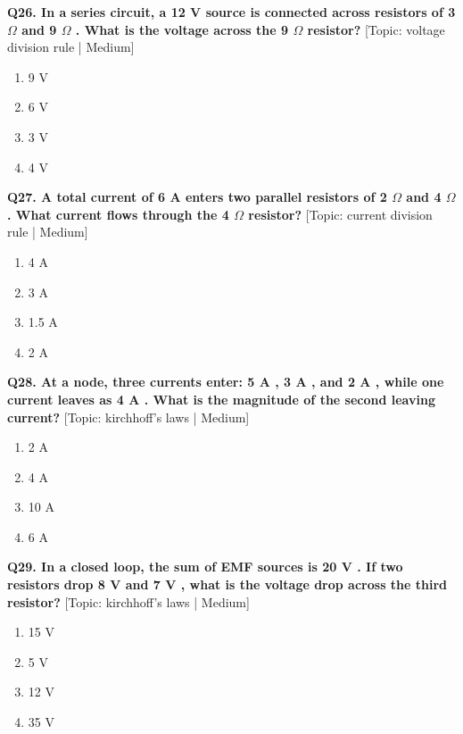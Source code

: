 \noindent\textbf{Q26. In a series circuit, a 12 V source is connected across resistors of 3 $\Omega$ and 9 $\Omega$ . What is the voltage across the 9 $\Omega$ resistor?} \hfill [Topic: voltage division rule | Medium]
\begin{enumerate}[label=(\alph*),topsep=2pt,itemsep=1pt,partopsep=0pt,parsep=0pt]
    \item {9 V}
    \item {6 V}
    \item {3 V}
    \item {4 V}
\end{enumerate}
\vspace{2mm}

\noindent\textbf{Q27. A total current of 6 A enters two parallel resistors of 2 $\Omega$ and 4 $\Omega$ . What current flows through the 4 $\Omega$ resistor?} \hfill [Topic: current division rule | Medium]
\begin{enumerate}[label=(\alph*),topsep=2pt,itemsep=1pt,partopsep=0pt,parsep=0pt]
    \item {4 A}
    \item {3 A}
    \item {1.5 A}
    \item {2 A}
\end{enumerate}
\vspace{2mm}

\noindent\textbf{Q28. At a node, three currents enter: 5 A , 3 A , and 2 A , while one current leaves as 4 A . What is the magnitude of the second leaving current?} \hfill [Topic: kirchhoff's laws | Medium]
\begin{enumerate}[label=(\alph*),topsep=2pt,itemsep=1pt,partopsep=0pt,parsep=0pt]
    \item {2 A}
    \item {4 A}
    \item {10 A}
    \item {6 A}
\end{enumerate}
\vspace{2mm}

\noindent\textbf{Q29. In a closed loop, the sum of EMF sources is 20 V . If two resistors drop 8 V and 7 V , what is the voltage drop across the third resistor?} \hfill [Topic: kirchhoff's laws | Medium]
\begin{enumerate}[label=(\alph*),topsep=2pt,itemsep=1pt,partopsep=0pt,parsep=0pt]
    \item {15 V}
    \item {5 V}
    \item {12 V}
    \item {35 V}
\end{enumerate}
\vspace{2mm}

